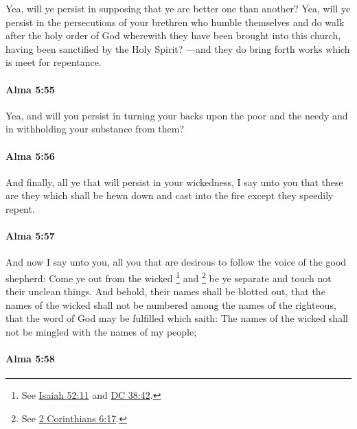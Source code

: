 			Yea, will ye persist in supposing that ye are better one than another?
			Yea, will ye persist in the persecutions of your brethren
			who humble themselves and do walk after the holy order of God
			wherewith they have been brought into this church,
			having been sanctified by the Holy Spirit?
			---and they do bring forth works which is meet for repentance.

		\paragraph{Alma 5:55} %
			\label{ALMA-5-55}

			Yea, and will you persist in turning your backs upon the poor and the needy
			and in withholding your substance from them?

		\paragraph{Alma 5:56} %
			\label{ALMA-5-56}

			And finally, all ye that will persist in your wickedness,
			I say unto you that these are they
			which shall be hewn down and cast into the fire
			except they speedily repent.

		\paragraph{Alma 5:57} %
			\label{ALMA-5-57}

			And now I say unto you,
			all you that are desirous to follow the voice of the good shepherd:
			Come ye out from the wicked%
				\footnote{%
					See \hyperref[ISAIAH-52-11]{Isaiah 52:11} and \hyperref[DC38-42]{DC 38:42}.
					}
			and
				\footnote{%
					See \hyperref[2CORINTHIANS-6-17]{2 Corinthians 6:17}.
					}%
			be ye separate and touch not their unclean things.
			And behold, their names shall be blotted out,
			that the names of the wicked shall not be numbered
			among the names of the righteous,
			that the word of God may be fulfilled which saith:
			The names of the wicked shall not be mingled with the names of my people;

		\paragraph{Alma 5:58} %
			\label{ALMA-5-58}

